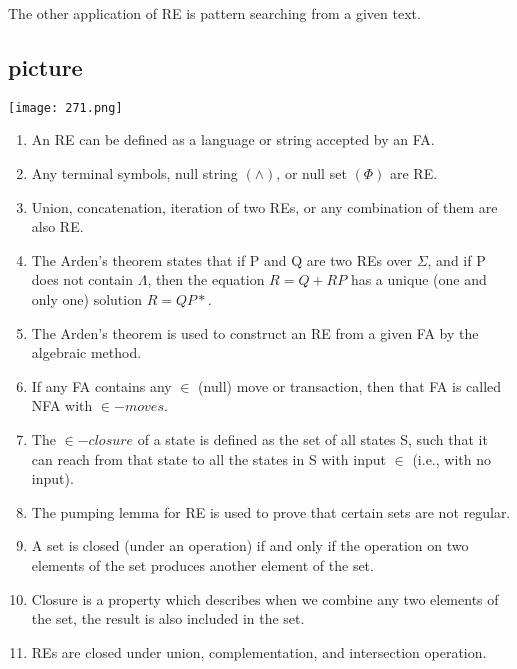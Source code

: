 \documentclass{article}
\begin{document}
\vspace*{0.2cm}
The other application of RE is pattern searching from a given text.\\

\vspace*{0.4cm}

\begin{center}
\section{picture}
\texttt{[image: 271.png]}
\end{center}


\begin{enumerate}
  \item An RE can be defined as a language or string accepted by an FA.\\
  \item Any terminal symbols, null string $(\wedge)$, or null set $(\Phi)$ are RE.\\
  \item Union, concatenation, iteration of two REs, or any combination of them are also RE.\\
  \item The Arden's theorem states that if P and Q are two REs over $\Sigma$, and if P does not contain $\Lambda$, then
the equation $R = Q + RP$ has a unique (one and only one) solution $R = QP*$.\\
  \item The Arden’s theorem is used to construct an RE from a given FA by the algebraic method.\\
  \item If any FA contains any $\in$ (null) move or transaction, then that FA is called NFA with $\in-moves$.\\
  \item The $\in-closure$ of a state is defined as the set of all states S, such that it can reach from that state to
all the states in S with input $\in$ (i.e., with no input).\\
  \item The pumping lemma for RE is used to prove that certain sets are not regular.\\
  \item A set is closed (under an operation) if and only if the operation on two elements of the set produces
another element of the set.\\
  \item Closure is a property which describes when we combine any two elements of the set, the result is
also included in the set.\\
  \item REs are closed under union, complementation, and intersection operation.\\
\end{enumerate}
\end{document}
